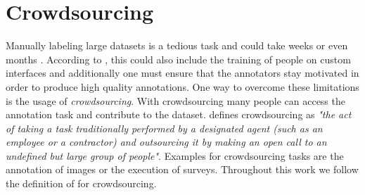 \section{Crowdsourcing}
\label{chp:fundamentals:sec:crowdsourcing}
Manually labeling large datasets is a tedious task and could take weeks or even months \parencite{Welinder:2010}.
According to \textcite{Welinder:2010}, this could also include the training of people on custom interfaces and additionally one must ensure that the annotators stay motivated in order to produce high quality annotations.
One way to overcome these limitations is the usage of \textit{crowdsourcing}.
With crowdsourcing many people can access the annotation task and contribute to the dataset.
\textcite{Howe:2008} defines crowdsourcing as \textit{"the act of taking a task traditionally performed by a designated agent (such as an employee or a contractor) and outsourcing it by making an open call to an undefined but large group of people"}.
Examples for crowdsourcing tasks are the annotation of images or the execution of surveys.
Throughout this work we follow the definition of \textcite{Howe:2008} for crowdsourcing.
